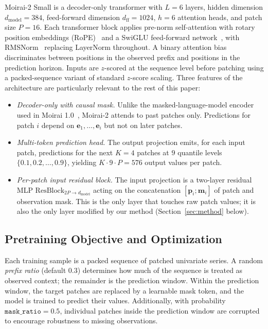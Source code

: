 \documentclass[11pt]{article}
\theoremstyle{plain}
\theoremstyle{definition}
\theoremstyle{remark}
\begin{document}
Moirai-2 Small is a decoder-only transformer with $L = 6$ layers, hidden dimension $d_{\text{model}} = 384$, feed-forward dimension $d_{\text{ff}} = 1024$, $h = 6$ attention heads, and patch size $P = 16$. Each transformer block applies pre-norm self-attention with rotary position embeddings (RoPE)~\citep{su2024rope} and a SwiGLU feed-forward network~\citep{shazeer2020glu}, with RMSNorm~\citep{zhang2019rms} replacing LayerNorm throughout. A binary attention bias~\citep{liu2024moirai2} discriminates between positions in the observed prefix and positions in the prediction horizon. Inputs are $z$-scored at the sequence level before patching using a packed-sequence variant of standard $z$-score scaling. Three features of the architecture are particularly relevant to the rest of this paper:
\begin{itemize}[leftmargin=1.5em, itemsep=0.1em, topsep=0.2em]
    \item \emph{Decoder-only with causal mask.} Unlike the masked-language-model encoder used in Moirai 1.0~\citep{woo2024unified}, Moirai-2 attends to past patches only. Predictions for patch $i$ depend on $\mathbf{e}_1, \ldots, \mathbf{e}_i$ but not on later patches.
    \item \emph{Multi-token prediction head.} The output projection emits, for each input patch, predictions for the next $K = 4$ patches at $9$ quantile levels $\{0.1, 0.2, \ldots, 0.9\}$, yielding $K \cdot 9 \cdot P = 576$ output values per patch.
    \item \emph{Per-patch input residual block.} The input projection is a two-layer residual MLP $\mathrm{ResBlock}_{2P \to d_{\text{model}}}$ acting on the concatenation $[\mathbf{p}_i; \mathbf{m}_i]$ of patch and observation mask. This is the only layer that touches raw patch values; it is also the only layer modified by our method (Section~\ref{sec:method} below).
\end{itemize}

\subsection{Pretraining Objective and Optimization}
\label{sec:pretraining-objective}

Each training sample is a packed sequence of patched univariate series. A random \emph{prefix ratio} (default $0.3$) determines how much of the sequence is treated as observed context; the remainder is the prediction window. Within the prediction window, the target patches are replaced by a learnable mask token, and the model is trained to predict their values. Additionally, with probability $\texttt{mask\_ratio} = 0.5$, individual patches inside the prediction window are corrupted to encourage robustness to missing observations.
\end{document}

